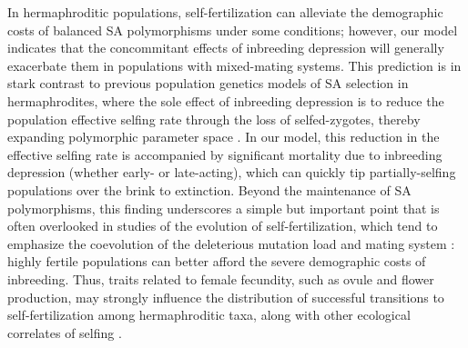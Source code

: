 \documentclass[11pt]{article}
\begin{document}

In hermaphroditic populations, self-fertilization can alleviate the demographic costs of balanced SA polymorphisms under some conditions; however, our model indicates that the concommitant effects of inbreeding depression will generally exacerbate them in populations with mixed-mating systems. This prediction is in stark contrast to previous population genetics models of SA selection in hermaphrodites, where the sole effect of inbreeding depression is to reduce the population effective selfing rate through the loss of selfed-zygotes, thereby expanding polymorphic parameter space \citep{JordanConnallon2014, Olito2017}. In our model, this reduction in the effective selfing rate is accompanied by significant mortality due to inbreeding depression (whether early- or late-acting), which can quickly tip partially-selfing populations over the brink to extinction. Beyond the maintenance of SA polymorphisms, this finding underscores a simple but important point that is often overlooked in studies of the evolution of self-fertilization, which tend to emphasize the coevolution of the deleterious mutation load and mating system \citep[e.g.,][]{Charlesworth1987, LandeSchemske1985, Goodwillie2005}: highly fertile populations can better afford the severe demographic costs of inbreeding. Thus, traits related to female fecundity, such as ovule and flower production, may strongly influence the distribution of successful transitions to self-fertilization among hermaphroditic taxa, along with other ecological correlates of selfing \citep{Goodwillie2005, Igic2006, Grossenbacher2015}.
\end{document}
